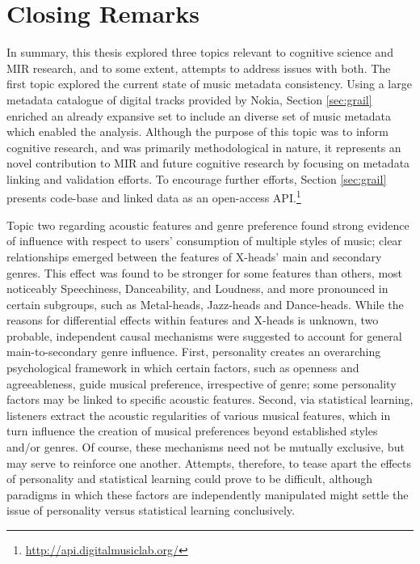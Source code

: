\documentclass[a4paper]{article}
\begin{document}
\section{Closing Remarks}
In summary, this thesis explored three topics relevant to cognitive science and MIR research, and to some extent, attempts to address issues with both.  The first topic explored the current state of music metadata consistency. Using a large metadata catalogue of digital tracks provided by Nokia, Section \ref{sec:grail} enriched an already expansive set to include an diverse set of music metadata which enabled the analysis. Although the purpose of this topic was to inform cognitive research, and was primarily methodological in nature, it represents an novel contribution to MIR and future cognitive research by focusing on metadata linking and validation efforts. To encourage further efforts, Section \ref{sec:grail} presents code-base and linked data as an open-access \Gls{API}.\footnote{\url{http://api.digitalmusiclab.org/}}

Topic two regarding acoustic features and genre preference found strong evidence of influence with respect to users’ consumption of multiple styles of music; clear relationships emerged between the features of X-heads’ main and secondary genres. This effect was found to be stronger for some features than others, most noticeably Speechiness, Danceability, and Loudness, and more pronounced in certain subgroups, such as Metal-heads, Jazz-heads and Dance-heads. While the reasons for differential effects within features and X-heads is unknown, two probable, independent causal mechanisms were suggested to account for general main-to-secondary genre influence. First, personality creates an overarching psychological framework in which certain factors, such as openness and agreeableness, guide musical preference, irrespective of genre; some personality factors may be linked to specific acoustic features. Second, via statistical learning, listeners extract the acoustic regularities of various musical features, which in turn influence the creation of musical preferences beyond established styles and/or genres. Of course, these mechanisms need not be mutually exclusive, but may serve to reinforce one another. Attempts, therefore, to tease apart the effects of personality and statistical learning could prove to be difficult, although paradigms in which these factors are independently manipulated might settle the issue of personality versus statistical learning conclusively. 
\end{document}
